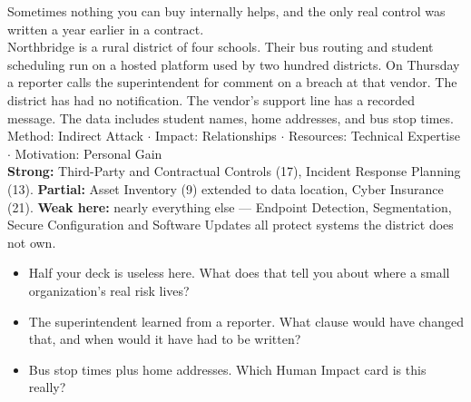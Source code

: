  Sometimes nothing you can buy internally helps, and the
only real control was written a year earlier in a contract.\\
 Northbridge is a rural district of four schools. Their bus
routing and student scheduling run on a hosted platform used by two hundred
districts. On Thursday a reporter calls the superintendent for comment on a
breach at that vendor. The district has had no notification. The vendor's
support line has a recorded message. The data includes student names, home
addresses, and bus stop times.\\
 Method: Indirect Attack $\cdot$ Impact: Relationships
$\cdot$ Resources: Technical Expertise $\cdot$ Motivation: Personal Gain\\
 \textbf{Strong:} Third-Party and Contractual Controls (17),
Incident Response Planning (13). \textbf{Partial:} Asset Inventory (9) extended
to data location, Cyber Insurance (21). \textbf{Weak here:} nearly everything
else --- Endpoint Detection, Segmentation, Secure Configuration and Software
Updates all protect systems the district does not own.\\
\begin{itemize}
\item Half your deck is useless here. What does that tell you about where a small
organization's real risk lives?
\item The superintendent learned from a reporter. What clause would have changed
that, and when would it have had to be written?
\item Bus stop times plus home addresses. Which Human Impact card is this really?
\end{itemize}

